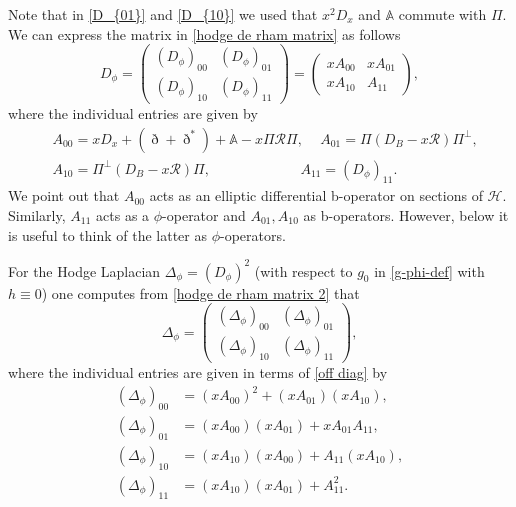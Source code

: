 \documentclass[11pt]{article}
\numberwithin{equation}{section}
\theoremstyle{plain}
\theoremstyle{definition}
\begin{document}
Note that in \eqref{D_{01}} and \eqref{D_{10}} we used that
$x^{2}D_{x}$ and $\mathbb{A}$ commute with $\Pi$.
We can express the matrix in \eqref{hodge de rham matrix} as follows
\begin{equation}\label{hodge de rham matrix 2}
D_\phi =
\begin{pmatrix}
(D_\phi)_{00} & (D_\phi)_{01}\\
(D_\phi)_{10} & (D_\phi)_{11}
\end{pmatrix}
= \begin{pmatrix}
xA_{00} & xA_{01}\\
xA_{10} & A_{11}
\end{pmatrix},
\end{equation}
where the individual entries are given by
\begin{equation} \label{off diag}
\begin{split}
&A_{00} = xD_{x} + (\eth + \eth^{*}) + \mathbb{A} - x\Pi \mathscr{R}\Pi,\,
\quad A_{01} = \Pi\left(D_{B} - x\mathscr{R} \right)\Pi^{\bot},\\
&A_{10} = \Pi^{\bot}\left(D_{B} - x\mathscr{R}\right)\Pi, \,
\qquad \qquad \qquad \ A_{11} = (D_\phi)_{11}.
\end{split}\end{equation}
We point out that $A_{00}$ acts as an elliptic differential b-operator on sections of $\mathscr{H}$.
Similarly, $A_{11}$ acts as a $\phi$-operator and $A_{01}, A_{10}$
as b-operators. However, below it is useful to think of the latter as $\phi$-operators.

For the Hodge Laplacian $\Delta_{\phi} = (D_\phi)^{2}$
(with respect to $g_0$ in \eqref{g-phi-def} with $h\equiv 0$) one computes from \eqref{hodge de rham matrix 2}
that
\begin{equation}\label{hodge laplace matrix }
\Delta_{\phi} =
\begin{pmatrix}
(\Delta_{\phi})_{00} & (\Delta_{\phi})_{01}\\
(\Delta_{\phi})_{10} & (\Delta_{\phi})_{11}
\end{pmatrix},
\end{equation}
where the individual entries are given in terms of \eqref{off diag} by
\begin{align*}
(\Delta_{\phi})_{00} &= (xA_{00})^{2} + (xA_{01})(xA_{10}),\\
(\Delta_{\phi})_{01} &= (xA_{00})(xA_{01})+ xA_{01}A_{11},\\
(\Delta_{\phi})_{10} &= (xA_{10})(xA_{00})+ A_{11}(xA_{10}),\\
(\Delta_{\phi})_{11} &= (xA_{10})(xA_{01}) + A_{11}^2.
\end{align*}
\end{document}
